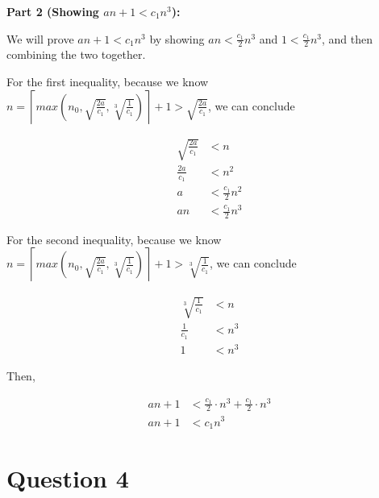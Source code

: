 \documentclass[12pt]{article}
\begin{document}
\begin{itemize}
    \textbf{Part 2 (Showing $an+1 < c_1n^3$):}

    \bigskip

    We will prove $an +1 < c_1n^3$ by showing $an < \frac{c_1}{2}n^3$ and
    $1 < \frac{c_1}{2}n^3$, and then combining the two together.

    \bigskip

    For the first inequality, because we know $n = \left\lceil max(n_0,
    \sqrt{\frac{2a}{c_1}}, \sqrt[3]{\frac{1}{c_1}}) \right\rceil + 1 > \sqrt{\frac{2a}{c_1}}$,
    we can conclude

    \begin{align}
        \sqrt{\frac{2a}{c_1}} &< n\\
        \frac{2a}{c_1} &< n^2\\
        a &< \frac{c_1}{2}n^2\\
        an &< \frac{c_1}{2}n^3
    \end{align}

    \bigskip

    For the second inequality, because we know $n = \left\lceil max(n_0,
    \sqrt{\frac{2a}{c_1}}, \sqrt[3]{\frac{1}{c_1}}) \right\rceil + 1 > \sqrt[3]{\frac{1}{c_1}}$,
    we can conclude

    \begin{align}
        \sqrt[3]{\frac{1}{c_1}} &< n\\
        \frac{1}{c_1} &< n^3\\
        1 &< n^3
    \end{align}

    \bigskip

    Then,

    \begin{align}
        an +1 &< \frac{c_1}{2} \cdot n^3 + \frac{c_1}{2} \cdot n^3\\
        an + 1 &< c_1n^3
    \end{align}

\end{itemize}

\section*{Question 4}
\end{document}

